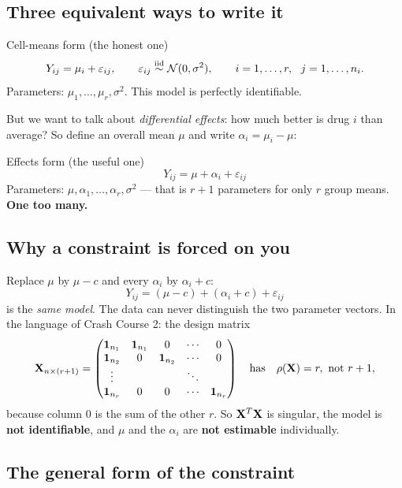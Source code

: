 \documentclass[11pt]{article}
\begin{document}
\subsection{Three equivalent ways to write it}

\begin{idea}{Cell-means form (the honest one)}
\[
  Y_{ij}=\mu_i+\varepsilon_{ij},\qquad \varepsilon_{ij}\overset{\text{iid}}{\sim} \mathcal{N}(0,\sigma^2),
  \qquad i=1,\dots,r,\ \ j=1,\dots,n_i .
\]
Parameters: $\mu_1,\dots,\mu_r,\sigma^2$. This model is perfectly identifiable.
\end{idea}

But we want to talk about \emph{differential effects}: how much better is drug $i$ than
average? So define an overall mean $\mu$ and write $\alpha_i=\mu_i-\mu$:

\begin{idea}{Effects form (the useful one)}
\[
  \boxed{\ Y_{ij}=\mu+\alpha_i+\varepsilon_{ij}\ }
\]
Parameters: $\mu,\alpha_1,\dots,\alpha_r,\sigma^2$ --- that is $r+1$ parameters for only $r$
group means. \textbf{One too many.}
\end{idea}

\subsection{Why a constraint is forced on you}

Replace $\mu$ by $\mu-c$ and every $\alpha_i$ by $\alpha_i+c$:
\[
  Y_{ij}=(\mu-c)+(\alpha_i+c)+\varepsilon_{ij}
\]
is the \emph{same model}. The data can never distinguish the two parameter vectors. In the
language of Crash Course 2: the design matrix
\[
  \mathbf{X}_{n\times(r+1)}=\begin{pmatrix}
    \mathbf{1}_{n_1} & \mathbf{1}_{n_1} & 0 & \cdots & 0\\
    \mathbf{1}_{n_2} & 0 & \mathbf{1}_{n_2} & \cdots & 0\\
    \vdots & & &\ddots& \\
    \mathbf{1}_{n_r} & 0&0&\cdots&\mathbf{1}_{n_r}
  \end{pmatrix}
  \quad\text{has}\quad \rho(\mathbf{X})=r,\ \text{not } r+1,
\]
because column $0$ is the sum of the other $r$. So $\mathbf{X}^T\mathbf{X}$ is singular, the model is
\textbf{not identifiable}, and $\mu$ and the $\alpha_i$ are \textbf{not estimable}
individually.

\subsection{The general form of the constraint}
\end{document}
